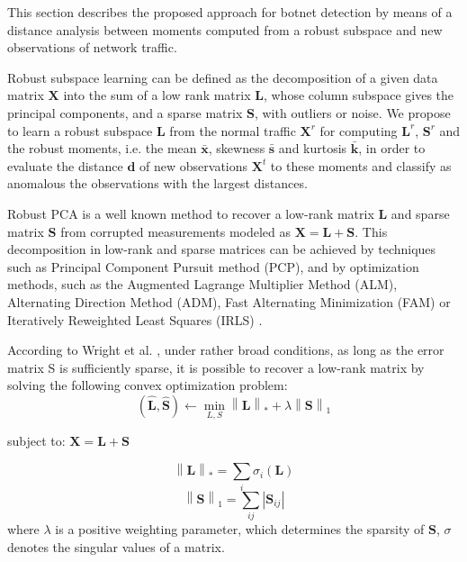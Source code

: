 \documentclass[review]{elsarticle}
\begin{document}
This section describes the proposed approach for botnet detection by means of a distance analysis between moments computed from a robust subspace and new observations of network traffic. 

Robust subspace learning can be defined as the decomposition of a given data matrix $\textbf{X}$ into the sum of a low rank matrix $\textbf{L}$, whose column subspace gives the principal components, and a sparse matrix $\textbf{S}$, with outliers or noise. We propose to learn a robust subspace $\textbf{L}$ from the normal traffic $\textbf{X}^r$ for computing $\textbf{L}^r$, $\textbf{S}^r$ and the robust moments, i.e. the mean $\boldsymbol{\bar{x}}$, skewness $\boldsymbol{\bar{s}}$ and kurtosis $\boldsymbol{\bar{k}}$, in order to evaluate the distance $\boldsymbol{d}$ of new observations $\boldsymbol{X}^t$ to these moments and classify as anomalous the observations with the largest distances.

Robust PCA is a well known method to recover a low-rank matrix $\textbf{L}$ and sparse matrix $\textbf{S}$ from corrupted measurements modeled as $\textbf{X} = \textbf{L} + \textbf{S}$. This decomposition in low-rank and sparse matrices can be achieved by techniques such as Principal Component Pursuit method (PCP), and by optimization methods, such as the Augmented Lagrange Multiplier Method (ALM), Alternating Direction Method (ADM), Fast Alternating Minimization (FAM) or Iteratively Reweighted Least Squares (IRLS) \cite{candes2011robust,vaswani2018robust,lerman2018overview}.

According to Wright et al. \cite{wright2009robust}, under rather broad conditions, as long as the error matrix S is sufficiently sparse, it is possible to recover a low-rank matrix by solving the following convex optimization problem:
\begin{equation}\label{eq:eq01}
	(\boldsymbol{\hat{L}}, \boldsymbol{\hat{S}})\leftarrow \min_{L,S}\left \| \boldsymbol{L} \right \|_{*} + \lambda \left \| \boldsymbol{S} \right \|_{1}
\end{equation}
\begin{center} subject to: $\boldsymbol{X} = \boldsymbol{L} + \boldsymbol{S}$ \end{center}
\begin{equation}\label{eq:eq02}
    \left \| \boldsymbol{L} \right \|_{*} = \sum_{i} \sigma_{i}(\boldsymbol{L})
\end{equation}
\begin{equation}\label{eq:eq03}
    \left \| \boldsymbol{S} \right \|_{1} = \sum_{ij} \left | \boldsymbol{S}_{ij} \right |
\end{equation}
where $\lambda$ is a positive weighting parameter, which determines the sparsity of $\boldsymbol{S}$, $\sigma$ denotes the singular values of a matrix. 
\end{document}
